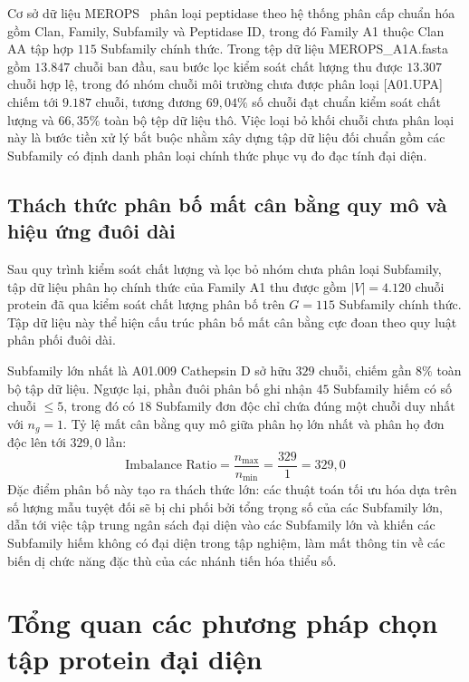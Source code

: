 Cơ sở dữ liệu MEROPS~\cite{merops} phân loại peptidase theo hệ thống phân cấp chuẩn hóa gồm Clan, Family, Subfamily và Peptidase ID, trong đó Family A1 thuộc Clan AA tập hợp $115$ Subfamily chính thức. Trong tệp dữ liệu MEROPS\_A1A.fasta gồm $13.847$ chuỗi ban đầu, sau bước lọc kiểm soát chất lượng thu được $13.307$ chuỗi hợp lệ, trong đó nhóm chuỗi môi trường chưa được phân loại [A01.UPA] chiếm tới $9.187$ chuỗi, tương đương $69{,}04\%$ số chuỗi đạt chuẩn kiểm soát chất lượng và $66{,}35\%$ toàn bộ tệp dữ liệu thô. Việc loại bỏ khối chuỗi chưa phân loại này là bước tiền xử lý bắt buộc nhằm xây dựng tập dữ liệu đối chuẩn gồm các Subfamily có định danh phân loại chính thức phục vụ đo đạc tính đại diện.

\subsection{Thách thức phân bố mất cân bằng quy mô và hiệu ứng đuôi dài}
\label{subsec:imbalance_challenge}

Sau quy trình kiểm soát chất lượng và lọc bỏ nhóm chưa phân loại Subfamily, tập dữ liệu phân họ chính thức của Family A1 thu được gồm $|V| = 4.120$ chuỗi protein đã qua kiểm soát chất lượng phân bố trên $G = 115$ Subfamily chính thức. Tập dữ liệu này thể hiện cấu trúc phân bố mất cân bằng cực đoan theo quy luật phân phối đuôi dài.

Subfamily lớn nhất là A01.009 Cathepsin D sở hữu $329$ chuỗi, chiếm gần $8\%$ toàn bộ tập dữ liệu. Ngược lại, phần đuôi phân bố ghi nhận $45$ Subfamily hiếm có số chuỗi $\le 5$, trong đó có $18$ Subfamily đơn độc chỉ chứa đúng một chuỗi duy nhất với $n_g = 1$. Tỷ lệ mất cân bằng quy mô giữa phân họ lớn nhất và phân họ đơn độc lên tới $329{,}0$ lần:
\begin{equation}
\label{eq:imbalance_ratio}
\text{Imbalance Ratio} = \frac{n_{\max}}{n_{\min}} = \frac{329}{1} = 329{,}0
\end{equation}
Đặc điểm phân bố này tạo ra thách thức lớn: các thuật toán tối ưu hóa dựa trên số lượng mẫu tuyệt đối sẽ bị chi phối bởi tổng trọng số của các Subfamily lớn, dẫn tới việc tập trung ngân sách đại diện vào các Subfamily lớn và khiến các Subfamily hiếm không có đại diện trong tập nghiệm, làm mất thông tin về các biến dị chức năng đặc thù của các nhánh tiến hóa thiểu số.

\section{Tổng quan các phương pháp chọn tập protein đại diện}
\label{sec:theory_rep_methods}

